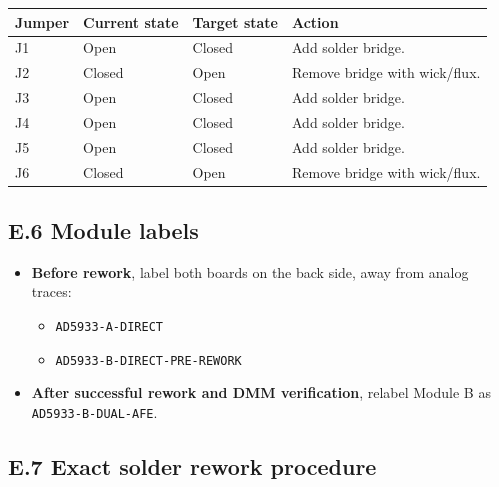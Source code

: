 \documentclass[11pt,a4paper]{article}
\begin{document}
\begin{xltabular}{\textwidth}{L{25mm}L{32mm}L{34mm}Y}
\toprule
\textbf{Jumper} & \textbf{Current state} & \textbf{Target state} & \textbf{Action}\\
\midrule
J1 & Open & Closed & Add solder bridge.\\
J2 & Closed & Open & Remove bridge with wick/flux.\\
J3 & Open & Closed & Add solder bridge.\\
J4 & Open & Closed & Add solder bridge.\\
J5 & Open & Closed & Add solder bridge.\\
J6 & Closed & Open & Remove bridge with wick/flux.\\
\bottomrule
\end{xltabular}

\subsection{E.6 Module labels}

\begin{itemize}
\item \textbf{Before rework}, label both boards on the back side, away from analog traces:
  \begin{itemize}
  \item \texttt{AD5933-A-DIRECT}
  \item \texttt{AD5933-B-DIRECT-PRE-REWORK}
  \end{itemize}
\item \textbf{After successful rework and DMM verification}, relabel Module B as \texttt{AD5933-B-DUAL-AFE}.
\end{itemize}

\subsection{E.7 Exact solder rework procedure}
\end{document}
